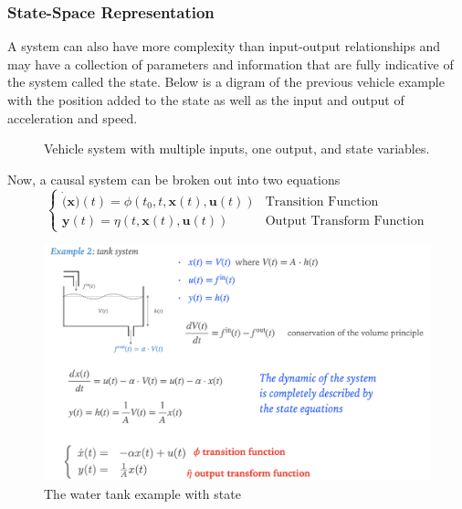\documentclass[11pt]{article}
\begin{document}
\subsubsection{State-Space Representation}
A system can also have more complexity than input-output relationships and may have a collection of parameters and information that are fully indicative of the system called the state.
Below is a digram of the previous vehicle example with the position added to the state as well as the input and output of acceleration and speed.
\begin{figure}[h]
  \centering
  \caption{Vehicle system with multiple inputs, one output, and state variables.}
  \label{figure:vehicle_system_with_state}
\end{figure}

Now, a causal system can be broken out into two equations
\begin{equation}
\begin{cases}
  \dot(\textbf{x})(t) = \phi(t_0, t, \textbf{x}(t), \textbf{u}(t)) & \text{Transition Function} \\
  \textbf{y}(t) = \eta(t, \textbf{x}(t), \textbf{u}(t)) & \text{Output Transform Function}
\end{cases}
\end{equation}

\begin{figure}[htbp]
  \centerline{\includegraphics[width=1\textwidth]{../../images/tank_system_state.png}}
  \caption{The water tank example with state}
  \label{fig:tank_system_state}
\end{figure}
\end{document}
